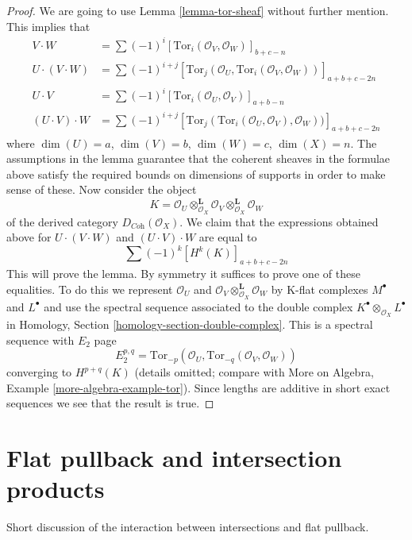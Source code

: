 \begin{proof}
We are going to use Lemma \ref{lemma-tor-sheaf} without further mention.
This implies that
\begin{align*}
V \cdot W
& =
\sum (-1)^i [\text{Tor}_i(\mathcal{O}_V, \mathcal{O}_W)]_{b + c - n} \\
U \cdot (V \cdot W)
& =
\sum (-1)^{i + j}
[
\text{Tor}_j(\mathcal{O}_U, \text{Tor}_i(\mathcal{O}_V, \mathcal{O}_W))
]_{a + b + c - 2n} \\
U \cdot V
& =
\sum (-1)^i [\text{Tor}_i(\mathcal{O}_U, \mathcal{O}_V)]_{a + b - n} \\
(U \cdot V) \cdot W
& =
\sum (-1)^{i + j}
[
\text{Tor}_j(\text{Tor}_i(\mathcal{O}_U, \mathcal{O}_V), \mathcal{O}_W))
]_{a + b + c - 2n}
\end{align*}
where $\dim(U) = a$, $\dim(V) = b$, $\dim(W) = c$, $\dim(X) = n$.
The assumptions in the lemma guarantee that the coherent sheaves
in the formulae above satisfy the required bounds on dimensions
of supports in order to make sense of these. Now consider the object
$$
K =
\mathcal{O}_U \otimes^\mathbf{L}_{\mathcal{O}_X} \mathcal{O}_V
\otimes^\mathbf{L}_{\mathcal{O}_X} \mathcal{O}_W
$$
of the derived category $D_{\textit{Coh}}(\mathcal{O}_X)$.
We claim that the expressions obtained above for
$U \cdot (V \cdot W)$ and $(U \cdot V) \cdot W$
are equal to
$$
\sum (-1)^k [H^k(K)]_{a + b + c - 2n}
$$
This will prove the lemma. By symmetry it suffices to prove one
of these equalities. To do this we represent $\mathcal{O}_U$
and $\mathcal{O}_V \otimes_{\mathcal{O}_X}^\mathbf{L} \mathcal{O}_W$
by K-flat complexes $M^\bullet$ and $L^\bullet$ and use the
spectral sequence associated to the double complex
$K^\bullet \otimes_{\mathcal{O}_X} L^\bullet$ in
Homology, Section \ref{homology-section-double-complex}.
This is a spectral sequence with $E_2$ page
$$
E_2^{p, q} =
\text{Tor}_{-p}(\mathcal{O}_U, \text{Tor}_{-q}(\mathcal{O}_V, \mathcal{O}_W))
$$
converging to $H^{p + q}(K)$ (details omitted; compare with
More on Algebra, Example \ref{more-algebra-example-tor}).
Since lengths are additive in short
exact sequences we see that the result is true.
\end{proof}


\section{Flat pullback and intersection products}
\label{section-flat-pullback-and-intersection-products}

\noindent
Short discussion of the interaction between intersections and
flat pullback.

